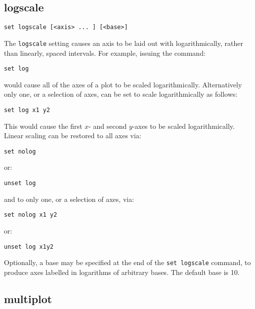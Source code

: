 \subsection{logscale}

\begin{verbatim}
set logscale [<axis> ... ] [<base>]
\end{verbatim}

The {\tt logscale} setting causes an axis to be laid out with logarithmically,
rather than linearly, spaced intervals.  For example, issuing the command:

\begin{verbatim}
set log
\end{verbatim}

\noindent would cause all of the axes of a plot to be scaled logarithmically. Alternatively
only one, or a selection of axes, can be set to scale logarithmically as
follows:

\begin{verbatim}
set log x1 y2
\end{verbatim}

This would cause the first $x$- and second $y$-axes to be scaled logarithmically.
Linear scaling can be restored to all axes via:

\begin{verbatim}
set nolog
\end{verbatim}

\noindent or:

\begin{verbatim}
unset log
\end{verbatim}

\noindent and to only one, or a selection of axes, via:

\begin{verbatim}
set nolog x1 y2
\end{verbatim}

\noindent or:

\begin{verbatim}
unset log x1y2
\end{verbatim}

Optionally, a base may be specified at the end of the {\tt set logscale}
command, to produce axes labelled in logarithms of arbitrary bases.  The default
base is 10.

\subsection{multiplot}

